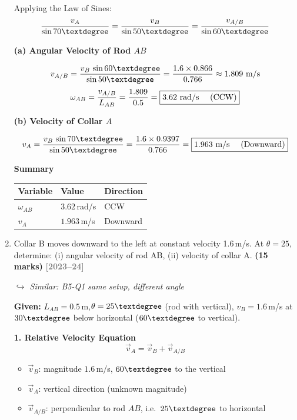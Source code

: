 \documentclass[12pt,a3paper]{article}
\newcommand{\yr}[1]{\hfill\textcolor{gray}{\small\textbf{[#1]}}}
\newcommand{\mk}[1]{\textcolor{orange!70!black}{\small\textbf{(#1 marks)}}}
\newcommand{\variant}[1]{\par\vspace{1pt}\textcolor{blue!50!black}%
  {\footnotesize\textit{$\hookrightarrow$ Similar: #1}}}
\begin{document}
\begin{enumerate}
\begin{tcolorbox}[enhanced,breakable,ansbox,colback=cH!4,colframe=cH,
  boxrule=0.8pt,arc=5pt,
  title={\textbf{Solution}},fonttitle=\bfseries\color{white},
  colbacktitle=cH]
Applying the Law of Sines:
\[
  \frac{v_A}{\sin 70\textdegree}
  = \frac{v_B}{\sin 50\textdegree}
  = \frac{v_{A/B}}{\sin 60\textdegree}
\]

\medskip
\textbf{(a) Angular Velocity of Rod $AB$}

\[
  v_{A/B} = \frac{v_B\,\sin 60\textdegree}{\sin 50\textdegree}
           = \frac{1.6\times 0.866}{0.766}
           \approx 1.809\text{ m/s}
\]
\[
  \omega_{AB} = \frac{v_{A/B}}{L_{AB}} = \frac{1.809}{0.5}
  = \boxed{3.62\text{ rad/s \quad(CCW)}}
\]

\medskip
\textbf{(b) Velocity of Collar $A$}

\[
  v_A = \frac{v_B\,\sin 70\textdegree}{\sin 50\textdegree}
      = \frac{1.6\times 0.9397}{0.766}
  = \boxed{1.963\text{ m/s \quad(Downward)}}
\]

\medskip
\textbf{Summary}

\begin{center}
\begin{tabular}{lll}
\toprule
\textbf{Variable} & \textbf{Value} & \textbf{Direction}\\
\midrule
$\omega_{AB}$ & $3.62$\,rad/s & CCW\\[3pt]
$v_A$         & $1.963$\,m/s  & Downward\\
\bottomrule
\end{tabular}
\end{center}

\end{tcolorbox}


\item \label{qlabel:B5-Q2}
Collar B moves downward to the left at constant velocity 1.6\,m/s. At $\theta = 25$\textdegree, determine: (i) angular velocity of rod AB, (ii) velocity of collar A. \mk{15}
\yr{2023--24} \variant{B5-Q1 same setup, different angle}


\begin{tcolorbox}[enhanced,breakable,ansbox,colback=cH!4,colframe=cH,
  boxrule=0.8pt,arc=5pt,
  title={\textbf{Solution}},fonttitle=\bfseries\color{white},
  colbacktitle=cH]

\textbf{Given:} $L_{AB} = 0.5$\,m,\quad $\theta = 25\textdegree$ (rod with vertical),\quad
$v_B = 1.6$\,m/s at $30\textdegree$ below horizontal ($60\textdegree$ to vertical).

\medskip
\textbf{1. Relative Velocity Equation}
\[
  \vec{v}_A = \vec{v}_B + \vec{v}_{A/B}
\]

\begin{itemize}[leftmargin=1.5em,itemsep=2pt]
  \item $\vec{v}_B$: magnitude $1.6$\,m/s, $60\textdegree$ to the vertical
  \item $\vec{v}_A$: vertical direction (unknown magnitude)
  \item $\vec{v}_{A/B}$: perpendicular to rod $AB$, i.e.\ $25\textdegree$ to horizontal
\end{itemize}


\end{tcolorbox}
\end{enumerate}
\end{document}
